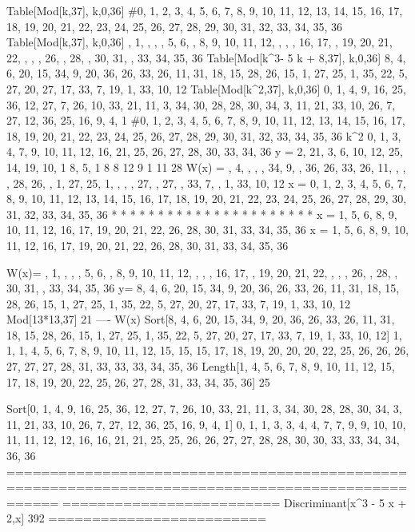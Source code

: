 Table[Mod[k,37], {k,0,36}]           #{0, 1, 2,  3,  4,  5,  6,  7,  8,  9, 10, 11, 12, 13, 14, 15, 16, 17, 18, 19, 20, 21, 22, 23, 24, 25, 26, 27, 28, 29, 30, 31, 32, 33, 34, 35, 36}
Table[Mod[k,37], {k,0,36}]            { , 1,  ,   ,   ,  5,  6,   ,  8,  9, 10, 11, 12,   ,   ,   , 16, 17,   , 19, 20, 21, 22,   ,   ,   , 26,   , 28,   , 30, 31,   , 33, 34, 35, 36}
Table[Mod[k^3- 5 k + 8,37], {k,0,36}] {8, 4, 6, 20, 15, 34,  9, 20, 36, 26, 33, 26, 11, 31, 18, 15, 28, 26, 15,  1, 27, 25,  1, 35, 22,  5, 27, 20, 27, 17, 33,  7, 19,  1, 33, 10, 12}
Table[Mod[k^2,37], {k,0,36}]          {0, 1, 4,  9, 16, 25, 36, 12, 27,  7, 26, 10, 33, 21, 11,  3, 34, 30, 28, 28, 30, 34,  3, 11, 21, 33, 10, 26,  7, 27, 12, 36, 25, 16,  9,  4,  1}
                                     #{0, 1, 2,  3,  4,  5,  6,  7,  8,  9, 10, 11, 12, 13, 14, 15, 16, 17, 18, 19, 20, 21, 22, 23, 24, 25, 26, 27, 28, 29, 30, 31, 32, 33, 34, 35, 36}
                                  k^2 {0, 1, 3, 4, 7, 9, 10, 11, 12, 16, 21, 25, 26, 27, 28, 30, 33, 34, 36}
                     y  = {   2,            21,  3,      6, 10, 12, 25, 14,             19, 10,      1   8,  5,  1               8       8      12   9       1  11      28}
                   W(x) = { , 4,  ,   ,   , 34,  9,   , 36, 26, 33, 26, 11,   ,   ,   , 28, 26,   ,  1, 27, 25,  1,   ,   ,   , 27,   , 27,   , 33,  7,   ,  1, 33, 10, 12}
                      x = {0, 1, 2,  3,  4,  5,  6,  7,  8,  9, 10, 11, 12, 13, 14, 15, 16, 17, 18, 19, 20, 21, 22, 23, 24, 25, 26, 27, 28, 29, 30, 31, 32, 33, 34, 35, 36}
                              *              *   *       *   *   *   *   *               *   *       *   *   *   *               *       *       *   *       *   *   *   *
                      x = {   1,             5,  6,      8,  9, 10, 11, 12,             16, 17,     19, 20, 21, 22,             26,     28,     30, 31,     33, 34, 35, 36}
                      x = {1, 5, 6, 8, 9, 10, 11, 12, 16, 17, 19, 20, 21, 22, 26, 28, 30,  31, 33, 34, 35, 36}
                      
W(x)=   { , 1,  ,   ,   ,  5,  6,   ,  8,  9, 10, 11, 12,   ,   ,   , 16, 17,   , 19, 20, 21, 22,   ,   ,   , 26,   , 28,   , 30, 31,   , 33, 34, 35, 36}
   y=   {8, 4, 6, 20, 15, 34,  9, 20, 36, 26, 33, 26, 11, 31, 18, 15, 28, 26, 15,  1, 27, 25,  1, 35, 22,  5, 27, 20, 27, 17, 33,  7, 19,  1, 33, 10, 12}
Mod[13*13,37] 21
----
W(x) Sort[{8, 4, 6, 20, 15, 34,  9, 20, 36, 26, 33, 26, 11, 31, 18, 15, 28, 26, 15,  1, 27, 25,  1, 35, 22,  5, 27, 20, 27, 17, 33,  7, 19,  1, 33, 10, 12}]
          {1, 1, 1, 4, 5, 6, 7, 8, 9, 10, 11, 12, 15, 15, 15, 17, 18, 19, 20, 20, 20, 22, 25, 26, 26, 26, 27, 27, 27, 28, 31, 33, 33, 33, 34, 35, 36}
   Length[{1, 4, 5, 6, 7, 8, 9, 10, 11, 12, 15, 17, 18, 19, 20, 22, 25, 26, 27, 28, 31, 33, 34, 35, 36}] 25

Sort[{0, 1, 4,  9, 16, 25, 36, 12, 27,  7, 26, 10, 33, 21, 11,  3, 34, 30, 28, 28, 30, 34,  3, 11, 21, 33, 10, 26,  7, 27, 12, 36, 25, 16,  9,  4,  1}]
     {0, 1, 1, 3, 3, 4, 4, 7, 7, 9, 9, 10, 10, 11, 11, 12, 12, 16, 16, 21, 21, 25, 25, 26, 26, 27, 27, 28, 28, 30, 30, 33, 33, 34, 34, 36, 36}
==================================================================================================
=========================
Discriminant[x^3 - 5 x + 2,x] 392
=========================
